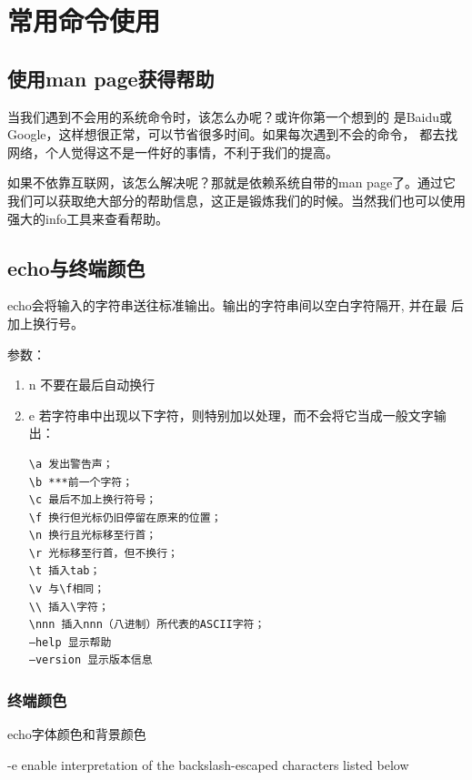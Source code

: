 \chapter{常用命令使用}
\label{sec:BasicCommand}



\section{使用man page获得帮助}
\label{sec:getHelp}

当我们遇到不会用的系统命令时，该怎么办呢？或许你第一个想到的
是Baidu或Google，这样想很正常，可以节省很多时间。如果每次遇到不会的命令，
都去找网络，个人觉得这不是一件好的事情，不利于我们的提高。

如果不依靠互联网，该怎么解决呢？那就是依赖系统自带的man page了。通过它我们可以获取绝大部分的帮助信息，这正是锻炼我们的时候。当然我们也可以使用强大的info工具来查看帮助。

\section{echo与终端颜色}
\label{sec:echoCmd}

echo会将输入的字符串送往标准输出。输出的字符串间以空白字符隔开, 并在最
后加上换行号。

参数：

\begin{enumerate}[itemsep=0pt,parsep=0pt]
\item \-n 不要在最后自动换行 
\item \-e 若字符串中出现以下字符，则特别加以处理，而不会将它当成一般文字输出： 
\begin{verbatim}
\a 发出警告声； 
\b ***前一个字符； 
\c 最后不加上换行符号； 
\f 换行但光标仍旧停留在原来的位置； 
\n 换行且光标移至行首； 
\r 光标移至行首，但不换行； 
\t 插入tab； 
\v 与\f相同； 
\\ 插入\字符； 
\nnn 插入nnn（八进制）所代表的ASCII字符； 
–help 显示帮助 
–version 显示版本信息
\end{verbatim}
\end{enumerate}

\subsection{终端颜色}

echo字体颜色和背景颜色 

-e enable interpretation of the backslash-escaped characters listed below 

